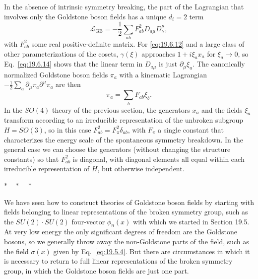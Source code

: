In the absence of intrinsic symmetry breaking, the part of the Lagrangian that involves only the Goldstone boson fields has a unique $d_i=2$ term
\begin{equation}
\mathcal L_{\mathrm{GB}}
=-\frac{1}{2}\sum_{ab}F^2_{ab}D_{a\mu}D_b^{\mu},
\tag{19.6.46}\label{eq:19.6.46}
\end{equation}
with $F^2_{ab}$ some real positive-definite matrix. For \eqref{eq:19.6.12} and a large class of other parameterizations of the cosets, $\gamma(\xi)$ approaches $1+i\xi_ax_a$ for $\xi_a\to0$, so Eq.~\eqref{eq:19.6.14} shows that the linear term in $D_{a\mu}$ is just $\partial_\mu\xi_a$. The canonically normalized Goldstone boson fields $\pi_a$ with a kinematic Lagrangian $-\tfrac12\sum_a\partial_\mu\pi_a\partial^\mu\pi_a$ are then
\begin{equation}
\pi_a=\sum_bF_{ab}\xi_b.
\tag{19.6.47}\label{eq:19.6.47}
\end{equation}
In the $SO(4)$ theory of the previous section, the generators $x_a$ and the fields $\xi_a$ transform according to an irreducible representation of the unbroken subgroup $H=SO(3)$, so in this case $F^2_{ab}=F_\pi^2\delta_{ab}$, with $F_\pi$ a single constant that characterizes the energy scale of the spontaneous symmetry breakdown. In the general case we can choose the generators (without changing the structure constants) so that $F^2_{ab}$ is diagonal, with diagonal elements all equal within each irreducible representation of $H$, but otherwise independent.

\begin{center}
$\ast\quad\ast\quad\ast$
\end{center}

We have seen how to construct theories of Goldstone boson fields by starting with fields belonging to linear representations of the broken symmetry group, such as the $SU(2)\cdot SU(2)$ four-vector $\phi_n(x)$ with which we started in Section 19.5. At very low energy the only significant degrees of freedom are the Goldstone bosons, so we generally throw away the non-Goldstone parts of the field, such as the field $\sigma(x)$ given by Eq.~\eqref{eq:19.5.4}. But there are circumstances in which it is necessary to return to full linear representations of the broken symmetry group, in which the Goldstone boson fields are just one part.

